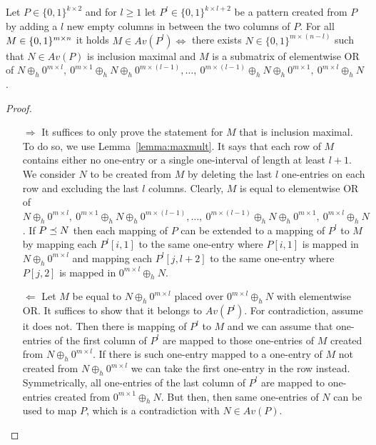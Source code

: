 \begin{thm}
Let $P\in\{0,1\}^{k\times2}$ and for $l\geq1$ let $P^l\in\{0,1\}^{k\times l+2}$ be a pattern created from $P$ by adding a $l$ new empty columns in between the two columns of $P$. For all $M\in\{0,1\}^{m\times n}$ it holds $M\in Av(P^l)\Leftrightarrow$ there exists $N\in\{0,1\}^{m\times(n-l)}$ such that $N\in Av(P)$ is inclusion maximal and $M$ is a submatrix of elementwise OR of $N\oplus_h0^{m\times l},\ 0^{m\times 1}\oplus_hN\oplus_h0^{m\times(l-1)},\dots,\ 0^{m\times(l-1)}\oplus_hN\oplus_h0^{m\times1},\ 0^{m\times l}\oplus_hN$.
\end{thm}
\begin{proof}
\begin{itemize}
	\item[$\Rightarrow$] It suffices to only prove the statement for $M$ that is inclusion maximal. To do so, we use Lemma~\ref{lemma:maxmult}. It says that each row of $M$ contains either no one-entry or a single one-interval of length at least $l+1$. We consider $N$ to be created from $M$ by deleting the last $l$ one-entries on each row and excluding the last $l$ columns. Clearly, $M$ is equal to elementwise OR of $N\oplus_h0^{m\times l},\ 0^{m\times 1}\oplus_hN\oplus_h0^{m\times(l-1)},\dots,\ 0^{m\times(l-1)}\oplus_hN\oplus_h0^{m\times1},\ 0^{m\times l}\oplus_hN$. If $P\preceq N$ then each mapping of $P$ can be extended to a mapping of $P^l$ to $M$ by mapping each $P^l[i,1]$ to the same one-entry where $P[i,1]$ is mapped in $N\oplus_h0^{m\times l}$ and mapping each $P^l[j,l+2]$ to the same one-entry where $P[j,2]$ is mapped in $0^{m\times l}\oplus_hN$.
	\item[$\Leftarrow$] Let $M$ be equal to $N\oplus_h0^{m\times l}$ placed over $0^{m\times l}\oplus_hN$ with elementwise OR. It suffices to show that it belongs to $Av(P^l)$. For contradiction, assume it does not. Then there is mapping of $P^l$ to $M$ and we can assume that one-entries of the first column of $P^l$ are mapped to those one-entries of $M$ created from $N\oplus_h0^{m\times l}$. If there is such one-entry mapped to a one-entry of $M$ not created from $N\oplus_h0^{m\times l}$ we can take the first one-entry in the row instead. Symmetrically, all one-entries of the last column of $P^l$ are mapped to one-entries created from $0^{m\times1}\oplus_hN$. But then, then same one-entries of $N$ can be used to map $P$, which is a contradiction with $N\in Av(P)$.
\end{itemize}
\end{proof}

